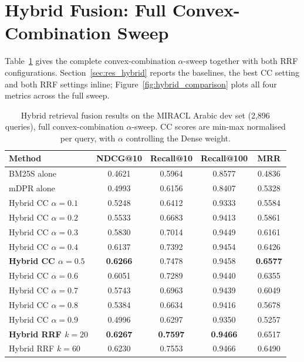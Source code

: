 \section{Hybrid Fusion: Full Convex-Combination Sweep}
\label{app:tab_hybrid}

Table~\ref{tab:hybrid_results_full} gives the complete convex-combination
$\alpha$-sweep together with both RRF configurations. Section~\ref{sec:res_hybrid}
reports the baselines, the best CC setting and both RRF settings inline;
Figure~\ref{fig:hybrid_comparison} plots all four metrics across the full sweep.

\begin{table}[htbp]
    \centering
    \caption[Hybrid fusion, full convex-combination sweep]{Hybrid retrieval fusion results on the MIRACL Arabic dev set (2,896 queries), full convex-combination $\alpha$-sweep. CC scores are min-max normalised per query, with $\alpha$ controlling the Dense weight.}
    \label{tab:hybrid_results_full}
    \begin{tabular}{@{}lcccc@{}}
        \toprule
        \textbf{Method} & \textbf{NDCG@10} & \textbf{Recall@10} & \textbf{Recall@100} & \textbf{MRR} \\
        \midrule
        BM25S alone & 0.4621 & 0.5964 & 0.8577 & 0.4836 \\
        mDPR alone & 0.4993 & 0.6156 & 0.8407 & 0.5328 \\
        \midrule
        Hybrid CC $\alpha=0.1$ & 0.5248 & 0.6412 & 0.9333 & 0.5584 \\
        Hybrid CC $\alpha=0.2$ & 0.5533 & 0.6683 & 0.9413 & 0.5861 \\
        Hybrid CC $\alpha=0.3$ & 0.5830 & 0.7014 & 0.9449 & 0.6161 \\
        Hybrid CC $\alpha=0.4$ & 0.6137 & 0.7392 & 0.9454 & 0.6426 \\
        \textbf{Hybrid CC $\alpha=0.5$} & \textbf{0.6266} & 0.7478 & 0.9458 & \textbf{0.6577} \\
        Hybrid CC $\alpha=0.6$ & 0.6051 & 0.7289 & 0.9440 & 0.6355 \\
        Hybrid CC $\alpha=0.7$ & 0.5743 & 0.6963 & 0.9439 & 0.6049 \\
        Hybrid CC $\alpha=0.8$ & 0.5384 & 0.6634 & 0.9416 & 0.5678 \\
        Hybrid CC $\alpha=0.9$ & 0.4996 & 0.6297 & 0.9350 & 0.5257 \\
        \midrule
        \textbf{Hybrid RRF $k=20$} & \textbf{0.6267} & \textbf{0.7597} & \textbf{0.9466} & 0.6517 \\
        Hybrid RRF $k=60$ & 0.6230 & 0.7553 & 0.9466 & 0.6490 \\
        \bottomrule
    \end{tabular}
\end{table}

